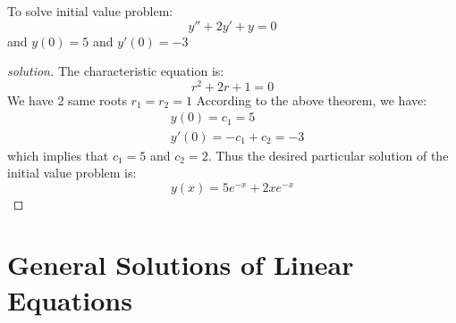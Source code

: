 \begin{example}
    To solve initial value problem:
    \[
        y'' + 2y' + y = 0
    \]
    and \(y(0) = 5\) and \(y'(0) = -3\)  
\end{example}
\begin{proof}[solution]
    The characteristic equation is: 
    \[
        r^2 + 2r + 1 = 0
    \]
    We have 2 same roots \(r_1 = r_2 = 1\) 
    According to the above theorem, we have:
    \begin{align*}
        &y(0) = c_1 = 5 \\
        &y'(0) = -c_1 + c_2 = -3
    \end{align*}
    which implies that \(c_1 = 5\) and \(c_2 = 2\).   
    Thus the desired particular solution of the initial value problem is:
    \[
        y(x) = 5e^{-x} + 2xe^{-x}
    \]
\end{proof}

\section{General Solutions of Linear Equations}